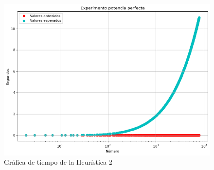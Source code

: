 \documentclass{uc3mpracticas}
\begin{document}
\begin{figure}[!h]
  \centering
  \includegraphics[width=.8\linewidth]{./Images/h2.png}
  \caption{Gráfica de tiempo de la Heurística 2}
  \label{fig:h2}
\end{figure}

\newpage



\end{document}
